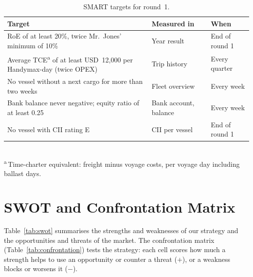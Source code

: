 \begin{table}[tbp]
  \centering\small
  \caption{SMART targets for round~1.}
  \label{tab:smart}
  \begin{tabularx}{\textwidth}{@{}>{\raggedright\arraybackslash}Xll@{}}
    \toprule
    Target & Measured in & When \\
    \midrule
    RoE of at least 20\%, twice Mr.\ Jones' minimum of 10\%~\cite{MBGintro} & Year result & End of round 1 \\
    Average TCE\textsuperscript{a} of at least USD~12,000 per Handymax-day (twice OPEX) & Trip history & Every quarter \\
    No vessel without a next cargo for more than two weeks & Fleet overview & Every week \\
    Bank balance never negative; equity ratio of at least 0.25 & Bank account, balance & Every week \\
    No vessel with CII rating E & CII per vessel & End of round 1 \\
    \bottomrule
  \end{tabularx}\\[2pt]
  {\footnotesize \textsuperscript{a}\,Time-charter equivalent: freight minus voyage costs, per voyage day including ballast days.}
\end{table}

\section{SWOT and Confrontation Matrix}\label{sec:swot}

Table~\ref{tab:swot} summarises the strengths and weaknesses of our strategy and the opportunities and threats of the market. The confrontation matrix (Table~\ref{tab:confrontation}) tests the strategy: each cell scores how much a strength helps to use an opportunity or counter a threat ($+$), or a weakness blocks or worsens it ($-$).

